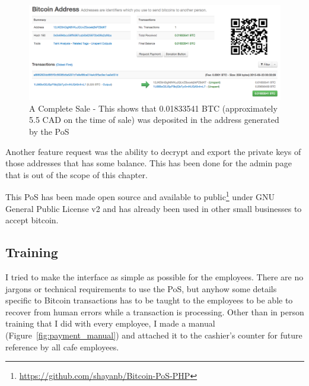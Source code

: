 \begin{figure}
\centering
\includegraphics[width=\linewidth]{fig/complete_sale.png}
  \caption{A Complete Sale - This shows that 0.01833541 BTC (approximately 5.5 CAD on the time of sale) was deposited in the address generated by the PoS} 
\label{fig:report_page}
\end{figure}


Another feature request was the ability to decrypt and export the private keys of those addresses that has some balance. This has been done for the admin page that is out of the scope of this chapter. 

This PoS has been made open source and available to public\footnote{\url{https://github.com/shayanb/Bitcoin-PoS-PHP}} under GNU General Public License v2 and has already been used in other small businesses to accept bitcoin.

\subsection{Training}

I tried to make the interface as simple as possible for the employees. There are no jargons or technical requirements to use the PoS, but anyhow some details specific to Bitcoin transactions has to be taught to the employees to be able to recover from human errors while a transaction is processing.
Other than in person training that I did with every employee, I made a manual (Figure~\ref{fig:payment_manual}) and attached it to the cashier's counter for future reference by all cafe employees.

